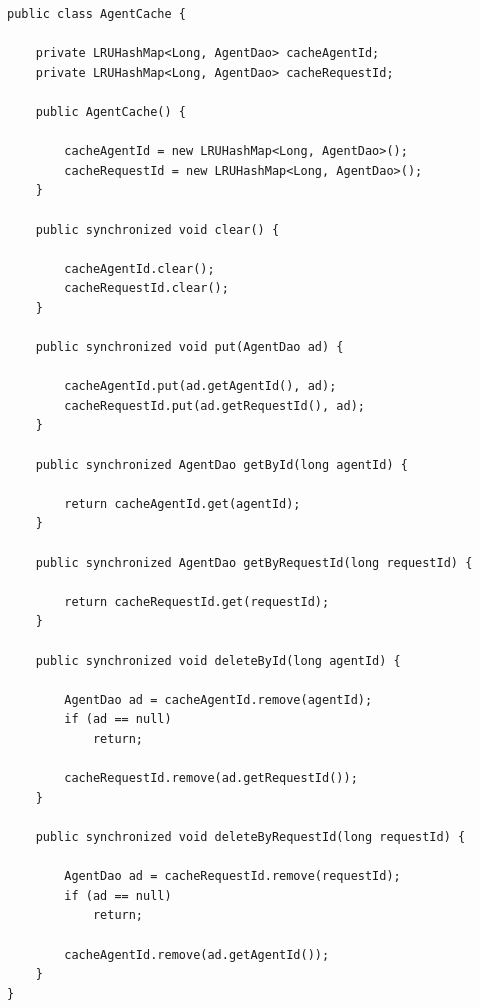 \documentclass[a4paper,11pt]{article}
\begin{document}
\begin{sloppypar}
\begin{lstlisting}
public class AgentCache {

    private LRUHashMap<Long, AgentDao> cacheAgentId;
    private LRUHashMap<Long, AgentDao> cacheRequestId;

    public AgentCache() {

        cacheAgentId = new LRUHashMap<Long, AgentDao>();
        cacheRequestId = new LRUHashMap<Long, AgentDao>();
    }

    public synchronized void clear() {

        cacheAgentId.clear();
        cacheRequestId.clear();
    }

    public synchronized void put(AgentDao ad) {

        cacheAgentId.put(ad.getAgentId(), ad);
        cacheRequestId.put(ad.getRequestId(), ad);
    }

    public synchronized AgentDao getById(long agentId) {

        return cacheAgentId.get(agentId);
    }

    public synchronized AgentDao getByRequestId(long requestId) {

        return cacheRequestId.get(requestId);
    }

    public synchronized void deleteById(long agentId) {

        AgentDao ad = cacheAgentId.remove(agentId);
        if (ad == null)
            return;

        cacheRequestId.remove(ad.getRequestId());
    }

    public synchronized void deleteByRequestId(long requestId) {

        AgentDao ad = cacheRequestId.remove(requestId);
        if (ad == null)
            return;

        cacheAgentId.remove(ad.getAgentId());
    }
}
\end{lstlisting}

\newpage


\end{sloppypar}
\end{document}
